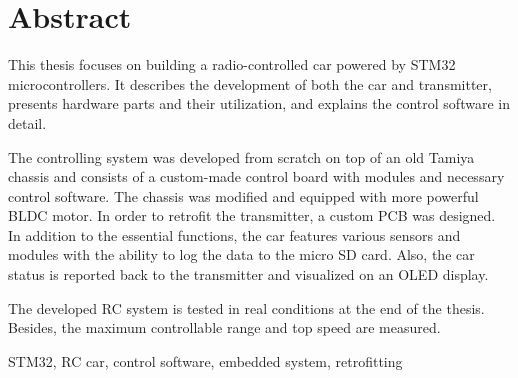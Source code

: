 \section*{Abstract}
\vspace{0.5cm}

This thesis focuses on building a radio-controlled car powered by STM32 microcontrollers. It describes the development of both the car and transmitter, presents hardware parts and their utilization, and explains the control software in detail.

The controlling system was developed from scratch on top of an old Tamiya chassis and consists of a custom-made control board with modules and necessary control software. The chassis was modified and equipped with more powerful BLDC motor. In order to retrofit the transmitter, a custom PCB was designed. In addition to the essential functions, the car features various sensors and modules with the ability to log the data to the micro SD card. Also, the car status is reported back to the transmitter and visualized on an OLED display.

The developed RC system is tested in real conditions at the end of the thesis. Besides, the maximum controllable range and top speed are measured.

\vspace{1cm}
 STM32, RC car, control software, embedded system, retrofitting
